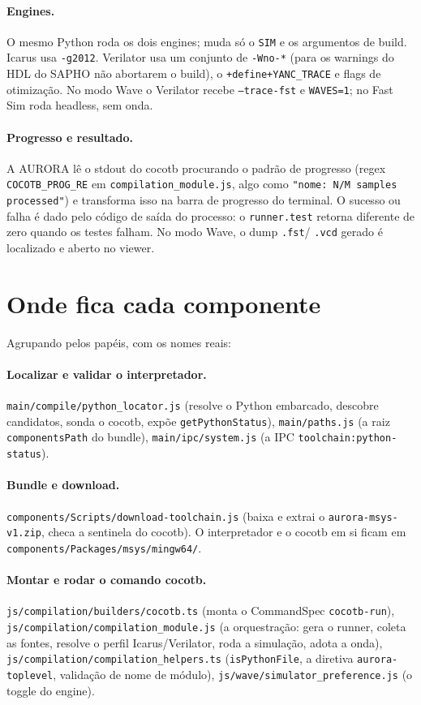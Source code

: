 \documentclass[11pt,a4paper]{article}
\begin{document}
\paragraph{Engines.} O mesmo Python roda os dois engines; muda só o \texttt{SIM}
e os argumentos de build. Icarus usa \texttt{-g2012}. Verilator usa um conjunto
de \texttt{-Wno-*} (para os warnings do HDL do SAPHO não abortarem o build), o
\texttt{+define+YANC\_TRACE} e flags de otimização. No modo Wave o Verilator
recebe \texttt{--trace-fst} e \texttt{WAVES=1}; no Fast Sim roda headless, sem
onda.

\paragraph{Progresso e resultado.} A AURORA lê o stdout do cocotb procurando o
padrão de progresso (regex \texttt{COCOTB\_PROG\_RE} em
\texttt{compilation\_module.js}, algo como \texttt{"nome: N/M samples
processed"}) e transforma isso na barra de progresso do terminal. O sucesso ou
falha é dado pelo código de saída do processo: o \texttt{runner.test} retorna
diferente de zero quando os testes falham. No modo Wave, o dump \texttt{.fst}/
\texttt{.vcd} gerado é localizado e aberto no viewer.

\section{Onde fica cada componente}

Agrupando pelos papéis, com os nomes reais:

\paragraph{Localizar e validar o interpretador.}
\texttt{main/compile/python\_locator.js} (resolve o Python embarcado, descobre
candidatos, sonda o cocotb, expõe \texttt{getPythonStatus}),
\texttt{main/paths.js} (a raiz \texttt{componentsPath} do bundle),
\texttt{main/ipc/system.js} (a IPC \texttt{toolchain:python-status}).

\paragraph{Bundle e download.}
\texttt{components/Scripts/download-toolchain.js} (baixa e extrai o
\texttt{aurora-msys-v1.zip}, checa a sentinela do cocotb). O interpretador e o
cocotb em si ficam em \texttt{components/Packages/msys/mingw64/}.

\paragraph{Montar e rodar o comando cocotb.}
\texttt{js/compilation/builders/cocotb.ts} (monta o CommandSpec
\texttt{cocotb-run}), \texttt{js/compilation/compilation\_module.js} (a
orquestração: gera o runner, coleta as fontes, resolve o perfil Icarus/Verilator,
roda a simulação, adota a onda), \texttt{js/compilation/compilation\_helpers.ts}
(\texttt{isPythonFile}, a diretiva \texttt{aurora-toplevel}, validação de nome de
módulo), \texttt{js/wave/simulator\_preference.js} (o toggle do engine).
\end{document}
